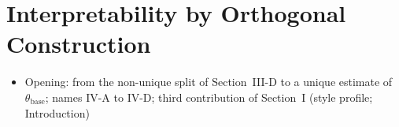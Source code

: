 \section{Interpretability by Orthogonal Construction}\label{sec:obc}
\ifdraft
\begin{itemize}
\item Opening: from the non-unique split of Section~III-D to a unique estimate of $\theta_{\mathrm{base}}$; names IV-A to IV-D; third contribution of Section~I (style profile; Introduction)
\end{itemize}
\fi

